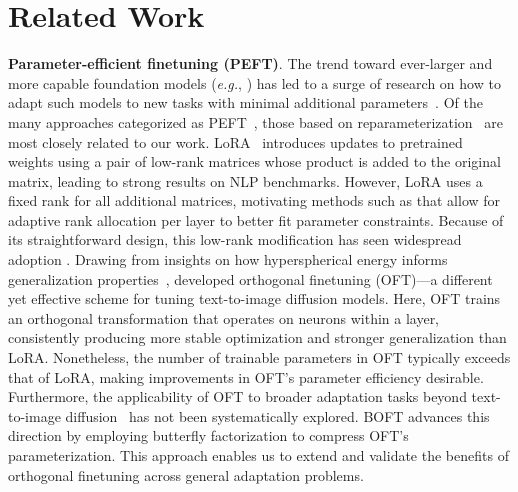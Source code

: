 \section{Related Work}

\textbf{Parameter-efficient finetuning (PEFT)}. The trend toward ever-larger and more capable foundation models (\emph{e.g.}, \cite{brown2020language,radford2021learning,rombach2022high,kirillov2023segment}) has led to a surge of research on how to adapt such models to new tasks with minimal additional parameters~\cite{treviso2023efficient,ding2023parameter,lialin2023scaling}. Of the many approaches categorized as PEFT~\cite{houlsby2019parameter,aghajanyan2020intrinsic,hulora2022,edalati2022krona,wang2022adamix,gheini2021cross,zaken2022bitfit,guo2020parameter,sung2021training,ansell2022composable,lester2021power,li2021prefix,vu2022spot,he2021towards,mao2021unipelt,karimi2021compacter,liu2022few,sung2022lst,chen2022parameter,jia2022visual,chen2022adaptformer,zhang2022neural,jie2023fact,lian2022scaling,luo2023towards}, those based on reparameterization~\cite{aghajanyan2020intrinsic,hulora2022,edalati2022krona} are most closely related to our work. LoRA~\cite{hulora2022} introduces updates to pretrained weights using a pair of low-rank matrices whose product is added to the original matrix, leading to strong results on NLP benchmarks. However, LoRA uses a fixed rank for all additional matrices, motivating methods such as \cite{zhang2022adaptive,valipour2022dylora,zhang2023increlora} that allow for adaptive rank allocation per layer to better fit parameter constraints. Because of its straightforward design, this low-rank modification has seen widespread adoption \cite{dettmers2023qlora,zi2023delta,chavan2023one}. Drawing from insights on how hyperspherical energy informs generalization properties~\cite{liu2018learning,liu2021orthogonal}, \cite{qiu2023controlling} developed orthogonal finetuning (OFT)—a different yet effective scheme for tuning text-to-image diffusion models. Here, OFT trains an orthogonal transformation that operates on neurons within a layer, consistently producing more stable optimization and stronger generalization than LoRA. Nonetheless, the number of trainable parameters in OFT typically exceeds that of LoRA, making improvements in OFT’s parameter efficiency desirable. Furthermore, the applicability of OFT to broader adaptation tasks beyond text-to-image diffusion~\cite{qiu2023controlling} has not been systematically explored. BOFT advances this direction by employing butterfly factorization to compress OFT’s parameterization. This approach enables us to extend and validate the benefits of orthogonal finetuning across general adaptation problems.

